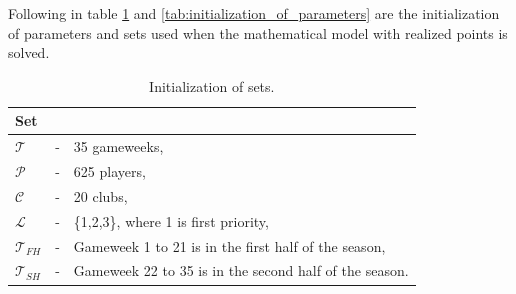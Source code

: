Following in table \ref{tab:initializations_of_sets} and \ref{tab:initialization_of_parameters} are the initialization of parameters and sets used when the mathematical model with realized points is solved. 

\begin{table}[H]
\centering
\caption{Initialization of sets.}
\begin{tabular}{@{}lll@{}}
\toprule
Set           &   &                                                               \\ \midrule
$\mathcal{T}$ & - & 35 gameweeks,                                             \\
$\mathcal{P}$ & - & 625 players,                                               \\
$\mathcal{C}$ & - & 20 clubs,                                                 \\
$\mathcal{L}$ & - & \{1,2,3\}, where 1 is first priority, \\
$\mathcal{T}_{FH}$ & - & Gameweek 1 to 21 is in the first half of the season,\\
$\mathcal{T}_{SH}$ & - & Gameweek 22 to 35 is in the second half of the season.\\
\bottomrule
\end{tabular}
\label{tab:initializations_of_sets}
\end{table}

